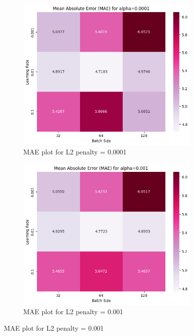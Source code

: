 \documentclass[12pt]{article}
\begin{document}
\begin{enumerate}
\vspace{20pt}


\begin{figure}[h]
    \centering
    \begin{subfigure}{0.45\textwidth}
        \centering
        \includegraphics[width=\textwidth]{./Part II/7_1.png}
        \caption{MAE plot for L2 penalty = 0.0001}
    \end{subfigure}
    \hfill
    \begin{subfigure}{0.45\textwidth}
        \centering
        \includegraphics[width=\textwidth]{./Part II/7_2.png}
        \caption{MAE plot for L2 penalty = 0.001}
    \end{subfigure}


\end{figure}
\end{enumerate}
\end{document}
